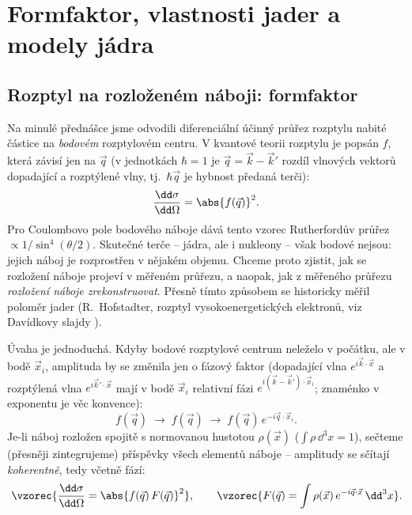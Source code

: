 \section{Formfaktor, vlastnosti jader a modely jádra}

\subsection{Rozptyl na rozloženém náboji: formfaktor}

Na minulé přednášce jsme odvodili diferenciální účinný průřez rozptylu nabité
částice na \emph{bodovém} rozptylovém centru. V kvantové teorii rozptylu je
popsán  \(f\), která závisí jen na
 \(\vec q\) (v jednotkách \(\hbar=1\) je
\(\vec q = \vec k - \vec k'\) rozdíl vlnových vektorů dopadající a rozptýlené
vlny, tj.\ \(\hbar\vec q\) je hybnost předaná terči):
\[
  \frac{\dd\sigma}{\dd\Omega} = \abs{f(\vec q)}^2 .
\]
Pro Coulombovo pole bodového náboje dává tento vzorec Rutherfordův průřez
\(\propto 1/\sin^4(\theta/2)\). Skutečné terče -- jádra, ale i nukleony -- však
bodové nejsou: jejich náboj je rozprostřen v nějakém objemu. Chceme proto
zjistit, jak se rozložení náboje projeví v měřeném průřezu, a naopak, jak
z měřeného průřezu \emph{rozložení náboje zrekonstruovat}. Přesně tímto
způsobem se historicky měřil poloměr jader (R.~Hofstadter, rozptyl
vysokoenergetických elektronů, viz Davídkovy slajdy ).

Úvaha je jednoduchá. Kdyby bodové rozptylové centrum neleželo v počátku, ale
v bodě \(\vec x_i\), amplituda by se změnila jen o fázový faktor (dopadající
vlna \(e^{i\vec k\cdot\vec x}\) a rozptýlená vlna \(e^{i\vec k'\cdot\vec x}\)
mají v bodě \(\vec x_i\) relativní fázi \(e^{i(\vec k-\vec k')\cdot\vec x_i}\);
znaménko v exponentu je věc konvence):
\[
  f(\vec q) \;\longrightarrow\; f(\vec q) \;\longrightarrow\; f(\vec q)\,e^{-i\vec q\cdot\vec x_i}.
\]
Je-li náboj rozložen spojitě s normovanou hustotou \(\rho(\vec x)\)
(\(\int\rho\,\dd^3x = 1\)), sečteme (přesněji zintegrujeme) příspěvky všech
elementů náboje -- amplitudy se sčítají \emph{koherentně}, tedy včetně fází:
\[
  \vzorec{\frac{\dd\sigma}{\dd\Omega} = \abs{f(\vec q)\,F(\vec q)}^2},
  \qquad
  \vzorec{F(\vec q) = \int \rho(\vec x)\,e^{-i\vec q\cdot\vec x}\,\dd^3x } .
\]

